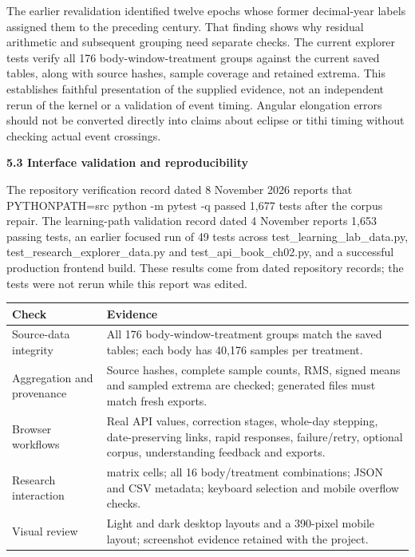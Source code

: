 \documentclass[
]{article}
\begin{document}
The earlier revalidation identified twelve epochs whose former
decimal-year labels assigned them to the preceding century. That finding
shows why residual arithmetic and subsequent grouping need separate
checks. The current explorer tests verify all 176 body-window-treatment
groups against the current saved tables, along with source hashes,
sample coverage and retained extrema. This establishes faithful
presentation of the supplied evidence, not an independent rerun of the
kernel or a validation of event timing. Angular elongation errors should
not be converted directly into claims about eclipse or tithi timing
without checking actual event crossings.

\textbf{5.3 Interface validation and reproducibility}

The repository verification record dated 8 November 2026 reports that
PYTHONPATH=src python -m pytest -q passed 1,677 tests after the corpus
repair. The learning-path validation record dated 4 November reports
1,653 passing tests, an earlier focused run of 49 tests across
test\_learning\_lab\_data.py, test\_research\_explorer\_data.py and
test\_api\_book\_ch02.py, and a successful production frontend build.
These results come from dated repository records; the tests were not
rerun while this report was edited.

\begin{longtable}[]{@{}
  >{\raggedright\arraybackslash}p{}
  >{\raggedright\arraybackslash}p{}@{}}
\toprule\noalign{}
\begin{minipage}[b]{\linewidth}\raggedright
Check
\end{minipage} & \begin{minipage}[b]{\linewidth}\raggedright
Evidence
\end{minipage} \\
\midrule\noalign{}
\endhead
\bottomrule\noalign{}
\endlastfoot
Source-data integrity & All 176 body-window-treatment groups match the
saved tables; each body has 40,176 samples per treatment. \\
Aggregation and provenance & Source hashes, complete sample counts, RMS,
signed means and sampled extrema are checked; generated files must match
fresh exports. \\
Browser workflows & Real API values, correction stages, whole-day
stepping, date-preserving links, rapid responses, failure/retry,
optional corpus, understanding feedback and exports. \\
Research interaction & 88 matrix cells; all 16 body/treatment
combinations; JSON and CSV metadata; keyboard selection and mobile
overflow checks. \\
Visual review & Light and dark desktop layouts and a 390-pixel mobile
layout; screenshot evidence retained with the project. \\
\end{longtable}
\end{document}
